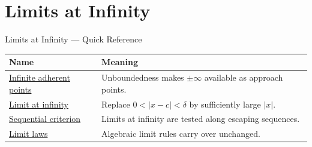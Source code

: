 
\section{Limits at Infinity}

\begin{toolkitbox}{Limits at Infinity --- Quick Reference}
\small
\begin{tabular}{l l}
\toprule
\textbf{Name} & \textbf{Meaning}\\
\midrule
\hyperref[def:infinite-adherent-points]{Infinite adherent points} & Unboundedness makes $\pm\infty$ available as approach points.\\
\hyperref[def:limit-at-infinity]{Limit at infinity} & Replace $0<|x-c|<\delta$ by sufficiently large $|x|$.\\
\hyperref[prop:sequential-criterion-limits]{Sequential criterion} & Limits at infinity are tested along escaping sequences.\\
\hyperref[thm:limit-sum]{Limit laws} & Algebraic limit rules carry over unchanged.\\
\bottomrule
\end{tabular}
\end{toolkitbox}



